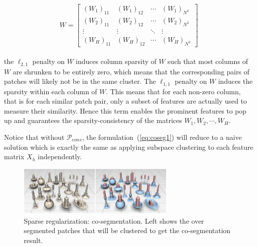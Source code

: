 \small{
\begin{equation}
 \label{eq:coseg3}
 W = {\left[ \begin{array}{cccc}
 (W_1)_{11} & (W_1)_{12} & \cdots & (W_1)_{N^2}\\
 (W_2)_{11} & (W_2)_{12} & \cdots & (W_2)_{N^2}\\
 \vdots & \vdots & \ddots & \vdots\\
 (W_{H})_{11} & (W_{H})_{12} & \cdots & (W_{H})_{N^2}
 \end{array}
 \right]}
\end{equation}
}
\\
the $\ell_{2,1}$ penalty on $W$ induces column sparsity of $W$ such that most columns of $W$ are shrunken to be entirely zero, which means that the corresponding pairs of patches will likely not be in the same cluster.
The $\ell_{1,1}$ penalty on $W$ induces the sparsity within each column of $W$.
This means that for each non-zero column, that is for each similar patch pair, only a subset of features are actually used to measure their similarity.
Hence this term enables the prominent features to pop up and guarantees the sparsity-consistency of the matrices $W_1,W_2,\cdots,W_H$.

Notice that without $\mathcal{P}_{cons}$, the formulation~(\ref{eq:coseg1}) will reduce to a naive solution which is exactly the same as applying subspace clustering to each feature matrix $X_{h}$ independently.

\begin{figure}[ht]
  \centering
  \includegraphics[width=3in]{images/co-segmentation}
  \caption{Sparse regularization: co-segmentation\cite{hu2012co}. Left shows the over segmented patches that will be clustered to get the co-segmentation result.}
  \label{fig:co-segmentation}
\end{figure}

